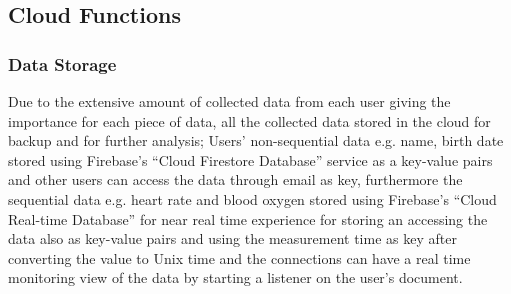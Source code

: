 \documentclass{bmcart}
\begin{document}
\subsection*{Cloud Functions}
\subsubsection*{Data Storage}
Due to the extensive amount of collected data from each user giving the
importance for each piece of data, all the collected data stored in the cloud
for backup and for further analysis; Users' non-sequential data e.g. name, birth
date  stored using Firebase's “Cloud Firestore Database” service as a key-value
pairs and other users can access the data through email as key, furthermore the
sequential data e.g. heart rate and blood oxygen stored using Firebase's “Cloud
Real-time Database” for near real time experience for storing an accessing the
data also as key-value pairs and using the measurement time as key after
converting the value to Unix time and the connections can have a real time
monitoring  view of the data by starting a listener on the user's document.
\end{document}
